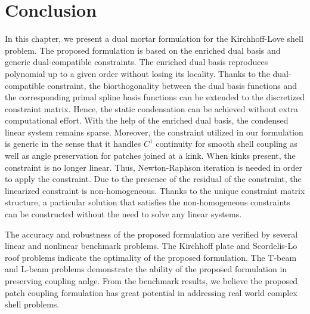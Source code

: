 \section{Conclusion}\label{sec:conlusion}
In this chapter, we present a dual mortar formulation for the Kirchhoff-Love shell problem. The proposed formulation is based on the enriched \Bezier dual basis and generic dual-compatible constraints. The enriched \Bezier dual basis reproduces polynomial up to a given order without losing its locality. Thanks to the dual-compatible constraint, the biorthogonality between the dual basis functions and the corresponding primal spline basis functions can be extended to the discretized constraint matrix. Hence, the static condensation can be achieved without extra computational effort. With the help of the enriched \Bezier dual basis, the condensed linear system remains sparse. Moreover, the constraint utilized in our formulation is generic in the sense that it handles $C^1$ continuity for smooth shell coupling as well as angle preservation for patches joined at a kink. When kinks present, the constraint is no longer linear. Thus, Newton-Raphson iteration is needed in order to apply the constraint. Due to the presence of the residual of the constraint, the linearized constraint is non-homogeneous. Thanks to the unique constraint matrix structure, a particular solution that satisfies the non-homogeneous constraints can be constructed without the need to solve any linear systems. \par

The accuracy and robustness of the proposed formulation are verified by several linear and nonlinear benchmark problems. The Kirchhoff plate and Scordelis-Lo roof problems indicate the optimality of the proposed formulation. The T-beam and L-beam problems demonstrate the ability of the proposed formulation in preserving coupling anlge. From the benchmark results, we believe the proposed patch coupling formulation has great potential in addressing real world complex shell problems.